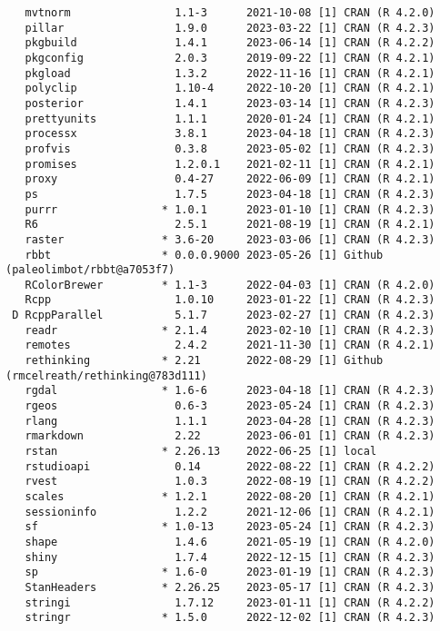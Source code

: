 \documentclass[twoside,12pt,final]{ucthesis-CA2012}
\begin{document}
\begin{ucmainmatter}
\begin{verbatim}
   mvtnorm                1.1-3      2021-10-08 [1] CRAN (R 4.2.0)
   pillar                 1.9.0      2023-03-22 [1] CRAN (R 4.2.3)
   pkgbuild               1.4.1      2023-06-14 [1] CRAN (R 4.2.2)
   pkgconfig              2.0.3      2019-09-22 [1] CRAN (R 4.2.1)
   pkgload                1.3.2      2022-11-16 [1] CRAN (R 4.2.1)
   polyclip               1.10-4     2022-10-20 [1] CRAN (R 4.2.1)
   posterior              1.4.1      2023-03-14 [1] CRAN (R 4.2.3)
   prettyunits            1.1.1      2020-01-24 [1] CRAN (R 4.2.1)
   processx               3.8.1      2023-04-18 [1] CRAN (R 4.2.3)
   profvis                0.3.8      2023-05-02 [1] CRAN (R 4.2.3)
   promises               1.2.0.1    2021-02-11 [1] CRAN (R 4.2.1)
   proxy                  0.4-27     2022-06-09 [1] CRAN (R 4.2.1)
   ps                     1.7.5      2023-04-18 [1] CRAN (R 4.2.3)
   purrr                * 1.0.1      2023-01-10 [1] CRAN (R 4.2.3)
   R6                     2.5.1      2021-08-19 [1] CRAN (R 4.2.1)
   raster               * 3.6-20     2023-03-06 [1] CRAN (R 4.2.3)
   rbbt                 * 0.0.0.9000 2023-05-26 [1] Github (paleolimbot/rbbt@a7053f7)
   RColorBrewer         * 1.1-3      2022-04-03 [1] CRAN (R 4.2.0)
   Rcpp                   1.0.10     2023-01-22 [1] CRAN (R 4.2.3)
 D RcppParallel           5.1.7      2023-02-27 [1] CRAN (R 4.2.3)
   readr                * 2.1.4      2023-02-10 [1] CRAN (R 4.2.3)
   remotes                2.4.2      2021-11-30 [1] CRAN (R 4.2.1)
   rethinking           * 2.21       2022-08-29 [1] Github (rmcelreath/rethinking@783d111)
   rgdal                * 1.6-6      2023-04-18 [1] CRAN (R 4.2.3)
   rgeos                  0.6-3      2023-05-24 [1] CRAN (R 4.2.3)
   rlang                  1.1.1      2023-04-28 [1] CRAN (R 4.2.3)
   rmarkdown              2.22       2023-06-01 [1] CRAN (R 4.2.3)
   rstan                * 2.26.13    2022-06-25 [1] local
   rstudioapi             0.14       2022-08-22 [1] CRAN (R 4.2.2)
   rvest                  1.0.3      2022-08-19 [1] CRAN (R 4.2.2)
   scales               * 1.2.1      2022-08-20 [1] CRAN (R 4.2.1)
   sessioninfo            1.2.2      2021-12-06 [1] CRAN (R 4.2.1)
   sf                   * 1.0-13     2023-05-24 [1] CRAN (R 4.2.3)
   shape                  1.4.6      2021-05-19 [1] CRAN (R 4.2.0)
   shiny                  1.7.4      2022-12-15 [1] CRAN (R 4.2.3)
   sp                   * 1.6-0      2023-01-19 [1] CRAN (R 4.2.3)
   StanHeaders          * 2.26.25    2023-05-17 [1] CRAN (R 4.2.3)
   stringi                1.7.12     2023-01-11 [1] CRAN (R 4.2.2)
   stringr              * 1.5.0      2022-12-02 [1] CRAN (R 4.2.3)

\end{verbatim}
\end{ucmainmatter}
\end{document}
